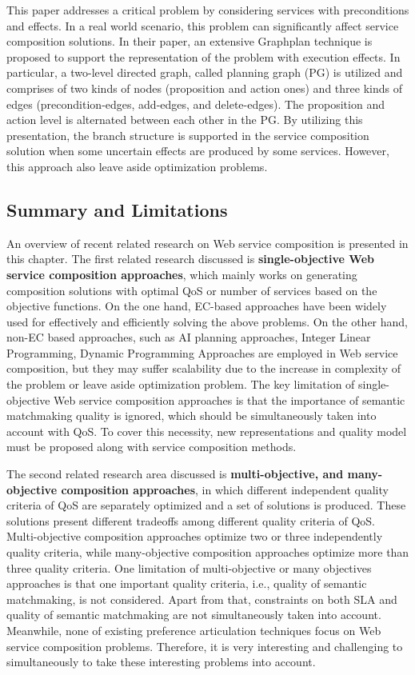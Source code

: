 This paper \cite{wang2016automatic}  addresses a critical problem by considering services with preconditions and effects. In a real world scenario, this problem can significantly affect service composition solutions.  In their paper, an extensive Graphplan technique is proposed to support the representation of the problem with execution effects. In particular, a two-level directed graph, called planning graph (PG) is utilized and comprises of two kinds of nodes (proposition and action ones) and three kinds of edges (precondition-edges, add-edges, and delete-edges). The proposition and action level is alternated between each other in the PG. By utilizing this presentation, the branch structure is supported in the service composition solution when some uncertain effects are produced by some services. However, this approach also leave aside optimization problems.

\subsection{Summary and Limitations}\label{summary}

An overview of recent related research on Web service composition is presented in this chapter. The first related research discussed is \textbf{single-objective Web service composition approaches}, which mainly works on generating composition solutions with optimal QoS or number of services based on the objective functions. On the one hand, EC-based approaches have been widely used for effectively and efficiently solving the above problems. On the other hand, non-EC based approaches, such as AI planning approaches, Integer Linear Programming, Dynamic Programming Approaches are employed in Web service composition, but they may suffer scalability due to the increase in complexity of the problem or leave aside optimization problem. The key limitation of single-objective Web service composition approaches is that the importance of semantic matchmaking quality is ignored, which should be simultaneously taken into account with QoS. To cover this necessity, new representations and quality model must be proposed along with service composition methods.

The second related research area discussed is \textbf{multi-objective, and many-objective composition approaches}, in which different independent quality criteria of QoS are separately optimized and a set of solutions is produced.  These solutions present different tradeoffs among different quality criteria of QoS. Multi-objective composition approaches optimize two or three independently quality criteria, while many-objective composition approaches optimize more than three quality criteria. One limitation of multi-objective or many objectives approaches is that one important quality criteria, i.e., quality of semantic matchmaking, is not considered. Apart from that,  constraints on both SLA and quality of semantic matchmaking are not simultaneously taken into account. Meanwhile, none of existing preference articulation techniques focus on Web service composition problems. Therefore, it is very interesting and challenging to simultaneously to take these interesting problems into account.

